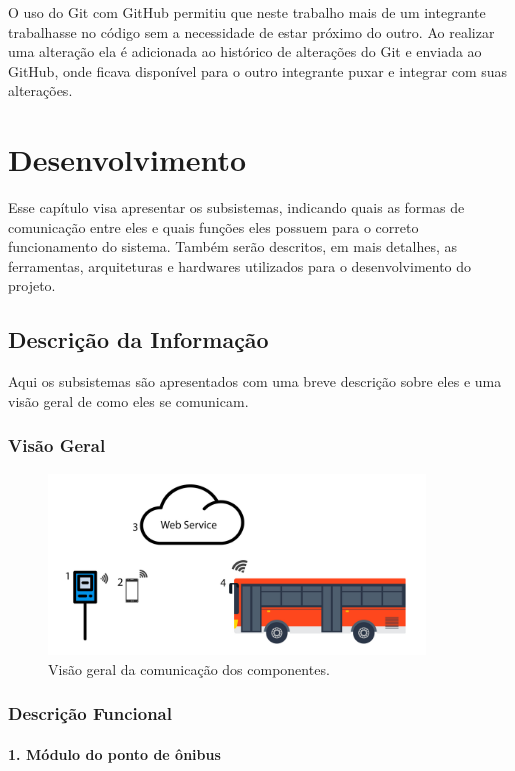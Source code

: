 \documentclass[
	12pt,				%
	oneside,			%
	a4paper,			%
	brazil				%
]{abntex2}
\begin{document}
O uso do Git com GitHub permitiu que neste trabalho mais de um integrante trabalhasse no código sem a necessidade de estar próximo do outro. Ao realizar uma alteração ela é adicionada ao histórico de alterações do Git e enviada ao GitHub, onde ficava disponível para o outro integrante puxar e integrar com suas alterações.


\chapter{Desenvolvimento}

Esse capítulo visa apresentar os subsistemas, indicando quais as formas de comunicação entre eles e quais funções eles possuem para o correto funcionamento do sistema. Também serão descritos, em mais detalhes, as ferramentas, arquiteturas e hardwares utilizados para o desenvolvimento do projeto.

\section{Descrição da Informação}

Aqui os subsistemas são apresentados com uma breve descrição sobre eles e uma visão geral de como eles se comunicam.

\subsection{Visão Geral}

\begin{figure}[H]
\centering
\includegraphics[width=10cm, center]{images/relations_system.jpg}
\caption{Visão geral da comunicação dos componentes.}
\label{Rotulo}
\end{figure}

\subsection{Descrição Funcional}

\subsubsection*{1. Módulo do ponto de ônibus}
\end{document}

